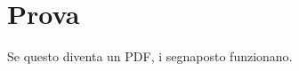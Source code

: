 \documentclass{article}
\begin{document}
\section{Prova}
Se questo diventa un PDF, i segnaposto funzionano.
\end{document}
